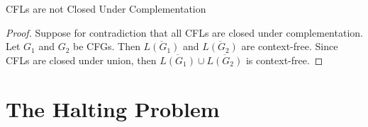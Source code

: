 \begin{thmbox}{CFLs are not Closed Under Complementation}{}
    \begin{proof}
        Suppose for contradiction that all CFLs are closed under complementation. Let $G_1$ and $G_2$ be CFGs. Then $\overline{L(G_1)}$ and $\overline{L(G_2)}$ are context-free. Since CFLs are closed under union, then $\overline{L(G_1)} \cup \overline{L(G_2)}$ is context-free.
    \end{proof}
\end{thmbox}


\section{The Halting Problem}

